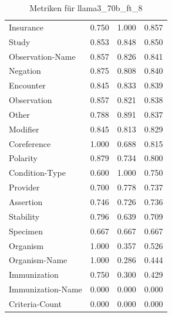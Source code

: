 \begin{table}[htbp]
\begin{tabular}{p{5cm}ccc}
Insurance & 0.750 & 1.000 & 0.857 \\
Study & 0.853 & 0.848 & 0.850 \\
Observation-Name & 0.857 & 0.826 & 0.841 \\
Negation & 0.875 & 0.808 & 0.840 \\
Encounter & 0.845 & 0.833 & 0.839 \\
Observation & 0.857 & 0.821 & 0.838 \\
Other & 0.788 & 0.891 & 0.837 \\
Modifier & 0.845 & 0.813 & 0.829 \\
Coreference & 1.000 & 0.688 & 0.815 \\
Polarity & 0.879 & 0.734 & 0.800 \\
Condition-Type & 0.600 & 1.000 & 0.750 \\
Provider & 0.700 & 0.778 & 0.737 \\
Assertion & 0.746 & 0.726 & 0.736 \\
Stability & 0.796 & 0.639 & 0.709 \\
Specimen & 0.667 & 0.667 & 0.667 \\
Organism & 1.000 & 0.357 & 0.526 \\
Organism-Name & 1.000 & 0.286 & 0.444 \\
Immunization & 0.750 & 0.300 & 0.429 \\
Immunization-Name & 0.000 & 0.000 & 0.000 \\
Criteria-Count & 0.000 & 0.000 & 0.000 \\
\bottomrule
\end{tabular}
\caption{Metriken für llama3_70b_ft_8}
\label{tab:metrics_llama3_70b_ft_8}
\end{table}
